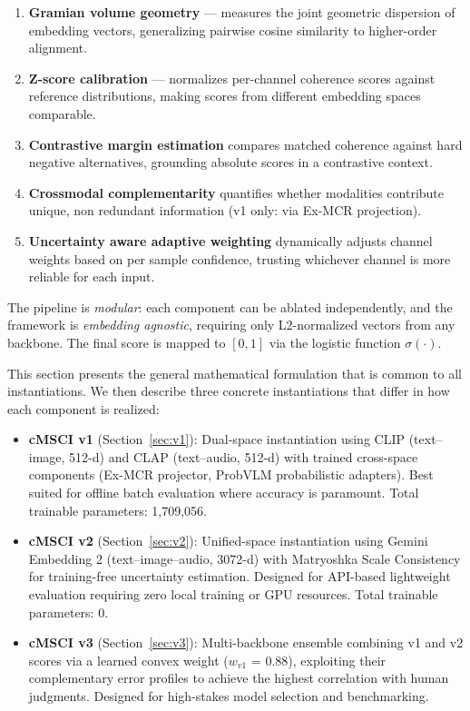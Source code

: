 \documentclass[a4paper,fleqn]{cas-sc}
\begin{document}
\begin{enumerate}
\item \textbf{Gramian volume geometry} --- measures the joint geometric dispersion of embedding vectors, generalizing pairwise cosine similarity to higher-order alignment.
\item \textbf{Z-score calibration} --- normalizes per-channel coherence scores against reference distributions, making scores from different embedding spaces comparable.
\item \textbf{Contrastive margin estimation} compares matched coherence against hard negative alternatives, grounding absolute scores in a contrastive context.
\item \textbf{Crossmodal complementarity} quantifies whether modalities contribute unique, non redundant information (v1 only: via Ex-MCR projection).
\item \textbf{Uncertainty aware adaptive weighting} dynamically adjusts channel weights based on per sample confidence, trusting whichever channel is more reliable for each input.
\end{enumerate}

The pipeline is \emph{modular}: each component can be ablated independently, and the framework is \emph{embedding agnostic}, requiring only L2-normalized vectors from any backbone. The final score is mapped to $[0, 1]$ via the logistic function $\sigma(\cdot)$.

This section presents the general mathematical formulation that is common to all instantiations. We then describe three concrete instantiations that differ in how each component is realized:

\begin{itemize}
\item \textbf{cMSCI v1} (Section~\ref{sec:v1}): Dual-space instantiation using CLIP (text--image, 512-d) and CLAP (text--audio, 512-d) with trained cross-space components (Ex-MCR projector, ProbVLM probabilistic adapters). Best suited for offline batch evaluation where accuracy is paramount. Total trainable parameters: 1,709,056.

\item \textbf{cMSCI v2} (Section~\ref{sec:v2}): Unified-space instantiation using Gemini Embedding 2 (text--image--audio, 3072-d) with Matryoshka Scale Consistency for training-free uncertainty estimation. Designed for API-based lightweight evaluation requiring zero local training or GPU resources. Total trainable parameters: 0.

\item \textbf{cMSCI v3} (Section~\ref{sec:v3}): Multi-backbone ensemble combining v1 and v2 scores via a learned convex weight ($w_{v1}$ = 0.88), exploiting their complementary error profiles to achieve the highest correlation with human judgments. Designed for high-stakes model selection and benchmarking.
\end{itemize}
\end{document}
